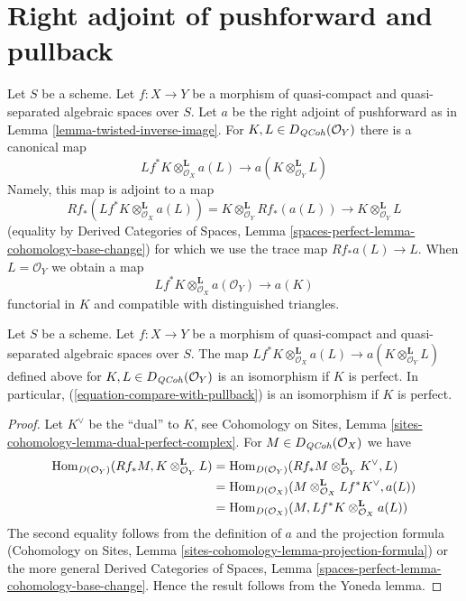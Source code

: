 \section{Right adjoint of pushforward and pullback}
\label{section-compare-with-pullback}

\noindent
Let $S$ be a scheme.
Let $f : X \to Y$ be a morphism of quasi-compact and quasi-separated
algebraic spaces over $S$.
Let $a$ be the right adjoint of pushforward as in
Lemma \ref{lemma-twisted-inverse-image}. For $K, L \in D_{\mathit{QCoh}}(\mathcal{O}_Y)$
there is a canonical map
$$
Lf^*K \otimes^\mathbf{L}_{\mathcal{O}_X} a(L)
\longrightarrow
a(K \otimes_{\mathcal{O}_Y}^\mathbf{L} L)
$$
Namely, this map is adjoint to a map
$$
Rf_*(Lf^*K \otimes^\mathbf{L}_{\mathcal{O}_X} a(L)) =
K \otimes^\mathbf{L}_{\mathcal{O}_Y} Rf_*(a(L))
\longrightarrow
K \otimes^\mathbf{L}_{\mathcal{O}_Y} L
$$
(equality by Derived Categories of Spaces, Lemma
\ref{spaces-perfect-lemma-cohomology-base-change})
for which we use the trace map $Rf_*a(L) \to L$.
When $L = \mathcal{O}_Y$ we obtain a map
\begin{equation}
\label{equation-compare-with-pullback}
Lf^*K \otimes^\mathbf{L}_{\mathcal{O}_X} a(\mathcal{O}_Y) \longrightarrow a(K)
\end{equation}
functorial in $K$ and compatible with distinguished triangles.

\begin{lemma}
\label{lemma-compare-with-pullback-perfect}
Let $S$ be a scheme.
Let $f : X \to Y$ be a morphism of quasi-compact and quasi-separated
algebraic spaces over $S$. The map
$Lf^*K \otimes^\mathbf{L}_{\mathcal{O}_X} a(L) \to
a(K \otimes_{\mathcal{O}_Y}^\mathbf{L} L)$
defined above for $K, L \in D_{\mathit{QCoh}}(\mathcal{O}_Y)$
is an isomorphism if $K$ is perfect. In particular,
(\ref{equation-compare-with-pullback}) is an isomorphism if $K$ is perfect.
\end{lemma}

\begin{proof}
Let $K^\vee$ be the ``dual'' to $K$, see
Cohomology on Sites, Lemma \ref{sites-cohomology-lemma-dual-perfect-complex}.
For $M \in D_{\mathit{QCoh}}(\mathcal{O}_X)$ we have
\begin{align*}
\mathop{\mathrm{Hom}}\nolimits_{D(\mathcal{O}_Y)}(Rf_*M, K \otimes^\mathbf{L}_{\mathcal{O}_Y} L)
& =
\mathop{\mathrm{Hom}}\nolimits_{D(\mathcal{O}_Y)}(
Rf_*M \otimes^\mathbf{L}_{\mathcal{O}_Y} K^\vee, L) \\
& =
\mathop{\mathrm{Hom}}\nolimits_{D(\mathcal{O}_X)}(
M \otimes^\mathbf{L}_{\mathcal{O}_X} Lf^*K^\vee, a(L)) \\
& =
\mathop{\mathrm{Hom}}\nolimits_{D(\mathcal{O}_X)}(M,
Lf^*K \otimes^\mathbf{L}_{\mathcal{O}_X} a(L))
\end{align*}
The second equality follows from the definition of $a$ and the projection formula
(Cohomology on Sites, Lemma
\ref{sites-cohomology-lemma-projection-formula})
or the more general Derived Categories of Spaces, Lemma
\ref{spaces-perfect-lemma-cohomology-base-change}.
Hence the result follows from the Yoneda lemma.
\end{proof}

